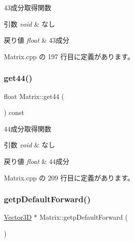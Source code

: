 43成分取得関数 


\begin{DoxyParams}{引数}
{\em void} & なし \\
\hline
\end{DoxyParams}

\begin{DoxyRetVals}{戻り値}
{\em float} & 43成分 \\
\hline
\end{DoxyRetVals}


 Matrix.\+cpp の 197 行目に定義があります。

\mbox{\label{class_matrix_a891abd390e49f286709c5962877395d8}} 
\subsubsection{\texorpdfstring{get44()}{get44()}}
{\footnotesize\ttfamily float Matrix\+::get44 (\begin{DoxyParamCaption}{ }\end{DoxyParamCaption}) const}



44成分取得関数 


\begin{DoxyParams}{引数}
{\em void} & なし \\
\hline
\end{DoxyParams}

\begin{DoxyRetVals}{戻り値}
{\em float} & 44成分 \\
\hline
\end{DoxyRetVals}


 Matrix.\+cpp の 209 行目に定義があります。

\mbox{\label{class_matrix_a8b8b21659e1239a4a5b4361bc72f1fad}} 
\subsubsection{\texorpdfstring{getp\+Default\+Forward()}{getpDefaultForward()}}
{\footnotesize\ttfamily \mbox{\hyperlink{class_vector3_d}{Vector3D}} $\ast$ Matrix\+::getp\+Default\+Forward (\begin{DoxyParamCaption}{ }\end{DoxyParamCaption})}



